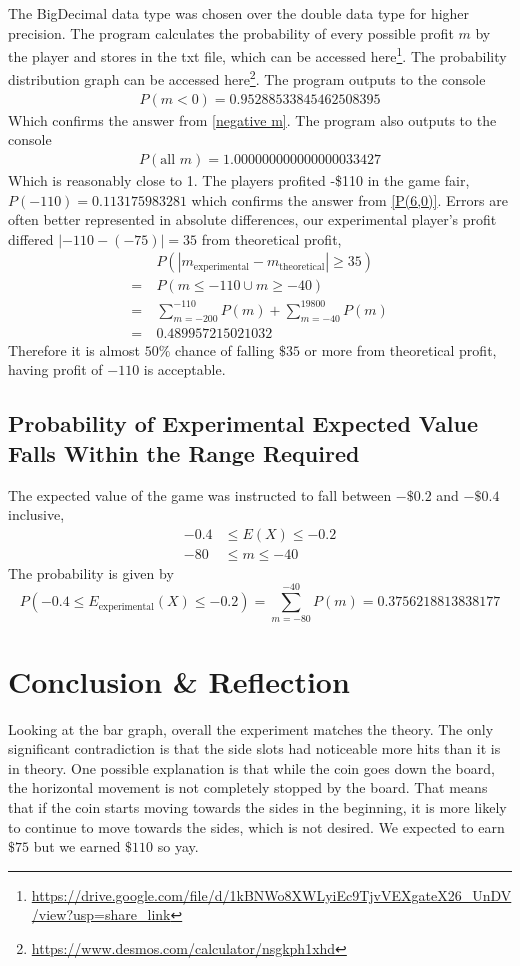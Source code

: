 \documentclass{article}
\begin{document}
The BigDecimal data type was chosen over the double data type for higher precision. The program calculates the probability of every possible profit $m$ by the player and stores in the txt file, which can be accessed here\footnote{\url{https://drive.google.com/file/d/1kBNWo8XWLyiEc9TjvVEXgateX26_UnDV/view?usp=share_link}}. The probability distribution graph can be accessed here\footnote{\url{https://www.desmos.com/calculator/nsgkph1xhd}}. The program outputs to the console
\begin{align*}
    P(m < 0) = 0.95288533845462508395
\end{align*}
Which confirms the answer from \ref{negative m}. The program also outputs to the console
\begin{align*}
    P(\text{all }m) = 1.000000000000000033427
\end{align*}
Which is reasonably close to 1. The players profited -\$110 in the game fair, $P(-110)=0.113175983281$ which confirms the answer from \ref{P(6,0)}. Errors are often better represented in absolute differences, our experimental player's profit differed $\left| -110-(-75)\right| =35$ from theoretical profit,
\begin{align*}
&P\left(\left|m_\text{experimental}-m_\text{theoretical}\right|\ge 35\right)\\
=\ &P(m\leq -110\cup m\ge -40)\\
=\ &\sum_{m=-200}^{-110}P(m)+\sum_{m=-40}^{19800}P(m)\\
=\ &0.489957215021032
\end{align*}
Therefore it is almost $50\%$ chance of falling $\$35$ or more from theoretical profit, having profit of $-110$ is acceptable.


\subsection{Probability of Experimental Expected Value \\Falls Within the Range Required}
The expected value of the game was instructed to fall between $-\$0.2$ and $-\$0.4$ inclusive,
\begin{align*}
    -0.4&\leq E(X)\leq -0.2\\
    -80&\leq m\leq -40
\end{align*}
The probability is given by
\[P\left(-0.4\leq E_\text{experimental}(X)\leq -0.2\right)=\sum_{m=-80}^{-40}P(m)=0.3756218813838177\]


\pagebreak
\section{Conclusion \& Reflection}
Looking at the bar graph, overall the experiment matches the theory. The only significant contradiction is that the side slots had noticeable more hits than it is in theory. One possible explanation is that while the coin goes down the board, the horizontal movement is not completely stopped by the board. That means that if the coin starts moving towards the sides in the beginning, it is more likely to continue to move towards the sides, which is not desired. We expected to earn $\$75$ but we earned $\$110$ so yay. 
\end{document}
